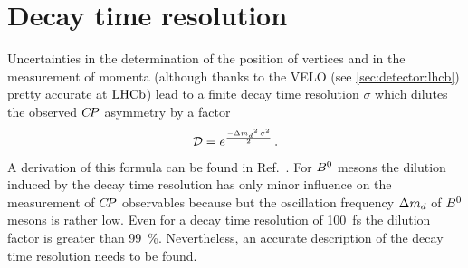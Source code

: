 \section{Decay time resolution}
\label{sec:dataanalysis::resolution}

Uncertainties in the determination of the position of vertices and in the
measurement of momenta (although thanks to the VELO (see
\cref{sec:detector:lhcb}) pretty accurate  at $\mbox{LHCb}$) lead to a finite decay
time resolution $\sigma$ which dilutes the observed ${C\!P}$ asymmetry by a
factor
%
\begin{align}
  \mathcal{D} = e^{\frac{-{\Delta m_{{d}}}^2\,\sigma^2}{2}} \, .
\end{align}
%
A derivation of this formula can be found in Ref.~\cite{LHCb-ANA-2011-001}.
For ${{B}^0}$ mesons the dilution induced by the decay time resolution has only
minor influence on the measurement of ${C\!P}$ observables because but the
oscillation frequency ${\Delta m_{{d}}}$ of ${{B}^0}$ mesons is rather low. Even for a decay
time resolution of \SI{100}{\fs} the dilution factor is greater than
\SI{99}{\percent}. Nevertheless, an accurate description of the decay time
resolution needs to be found.